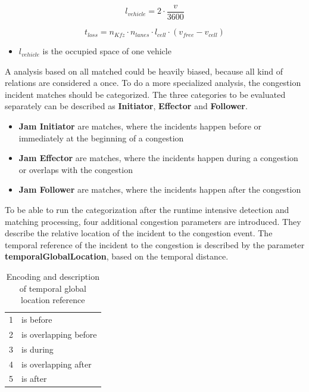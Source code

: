 \begin{equation}
	l_{vehicle} = 2 \cdot \frac{v}{3600}
\end{equation}




\begin{equation}
	t_{loss} = n_{Kfz} \cdot n_{lanes} \cdot l_{cell} \cdot ( v_{free} - v_{cell})
\end{equation}

\smallskip

\begin{itemize}
	\setlength\itemsep{0.1em}	
	\item[] $l_{vehicle}$ is the occupied space of one vehicle
\end{itemize}

A analysis based on all matched could be heavily biased, because all kind of relations are considered a once. To do a more specialized analysis, the congestion incident matches should be categorized. The three categories to be evaluated separately can be described as \textbf{Initiator}, \textbf{Effector} and \textbf{Follower}.
\begin{itemize}
	\setlength\itemsep{0.1em}	
	\item[] \textbf{Jam Initiator} are matches, where the incidents happen before or immediately at the beginning of a congestion
	\item[] \textbf{Jam Effector} are matches, where the incidents happen during a congestion or overlaps with the congestion
	\item[] \textbf{Jam Follower} are matches, where the incidents happen after the congestion
\end{itemize}


To be able to run the categorization after the runtime intensive detection and matching processing, four additional congestion parameters are introduced. They describe the relative location of the incident to the congestion event. The temporal reference of the incident to the congestion is described by the parameter \textbf{temporalGlobalLocation}, based on the temporal distance. 
\begin{table}[ht]
	\centering
	\begin{tabular}{c|l}  
		1 & is before \\ 
 		2 & is overlapping before \\ 
 		3 & is during \\
 		4 & is overlapping after \\
 		5 & is after \\
	\end{tabular}
	\caption{Encoding and description of temporal global location reference}
	\vspace{-4mm}
\end{table}


